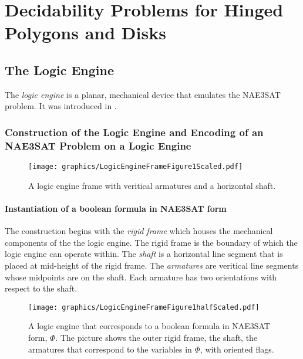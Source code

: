 \chapter{Decidability Problems for Hinged Polygons and Disks}
\section{The Logic Engine}
The \textit{logic engine} is a planar, mechanical device that emulates the NAE3SAT problem. It was introduced in \cite{BC87}.
\subsection{Construction of the Logic Engine and Encoding of an NAE3SAT Problem on a Logic 
Engine}

\begin{figure}[!h]
\begin{center}
\texttt{[image: graphics/LogicEngineFrameFigure1Scaled.pdf]}
\caption{A logic engine frame with veritical armatures and a horizontal shaft.}
\label{fig:LogicEngineFrameFigure1.pdf}
\end{center}
\end{figure}

\subsubsection{Instantiation of a boolean formula in NAE3SAT form}

 The construction begins with the \textit{rigid frame} which houses the mechanical components of the the logic engine.  The rigid frame is the boundary of which the logic engine can operate within.  The 
\textit{shaft} is a horizontal line segment that is placed at mid-height of the rigid frame. The 
\textit{armatures} are veritical line segments whose midpoints are on the shaft.  Each armature 
has two orientations with respect to the shaft. 

\begin{figure}[!h]
\begin{center}
\texttt{[image: graphics/LogicEngineFrameFigure1halfScaled.pdf]}
\caption{A logic engine that corresponds to a boolean formula in NAE3SAT form, $\Phi$.  The picture shows the outer rigid frame, the shaft, the armatures that correspond to the variables in $\Phi$, with oriented flags.}\label{fig:LogicEngineFrameFigure1halfScaled.pdf}
\end{center}
\end{figure}

